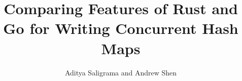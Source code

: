 \documentclass{article}
\begin{document}
\title{Comparing Features of Rust and Go for Writing Concurrent Hash Maps}

\author{Aditya Saligrama and Andrew Shen}

\maketitle

\begin{multicols}{2}
[







]
\end{multicols}
\end{document}
